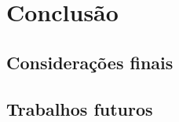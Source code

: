 
\chapter{Conclusão}\label{chap:conclusão}

\section{Considerações finais}

\section{Trabalhos futuros}

